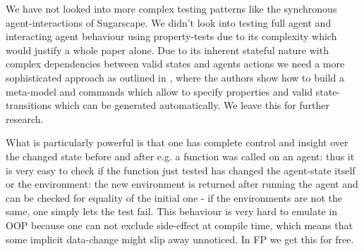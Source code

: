 We have not looked into more complex testing patterns like the synchronous agent-interactions of Sugarscape. We didn't look into testing full agent and interacting agent behaviour using property-tests due to its complexity which would justify a whole paper alone. Due to its inherent stateful nature with complex dependencies between valid states and agents actions we need a more sophisticated approach as outlined in \cite{de_vries_-depth_2019}, where the authors show how to build a meta-model and commands which allow to specify properties and valid state-transitions which can be generated automatically. We leave this for further research.

What is particularly powerful is that one has complete control and insight over the changed state before and after e.g. a function was called on an agent: thus it is very easy to check if the function just tested has changed the agent-state itself or the environment: the new environment is returned after running the agent and can be checked for equality of the initial one - if the environments are not the same, one simply lets the test fail. This behaviour is very hard to emulate in OOP because one can not exclude side-effect at compile time, which means that some implicit data-change might slip away unnoticed. In FP we get this for free.
